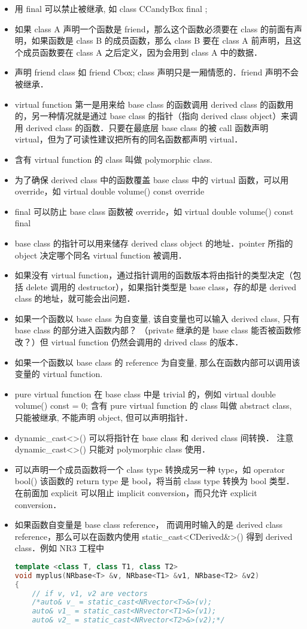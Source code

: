 \begin{itemize}
\item 用 final 可以禁止被继承, 如 class CCandyBox final {};
\item 如果 class A 声明一个函数是 friend，那么这个函数必须要在 class 的前面有声明，如果函数是 class B 的成员函数，那么 class B 要在 class A 前声明，且这个成员函数要在 class A 之后定义，因为会用到 class A 中的数据．
\item 声明 friend class 如 friend Cbox; class 声明只是一厢情愿的．friend 声明不会被继承．
\item virtual function 第一是用来给 base class 的函数调用 derived class 的函数用的，另一种情况就是通过 base class 的指针（指向 derived class object）来调用 derived class 的函数．只要在最底层 base class 的被 call 函数声明 virtual，但为了可读性建议把所有的同名函数都声明 virtual．
\item 含有 virtual function 的 class 叫做 polymorphic class.
\item 为了确保 derived class 中的函数覆盖 base class 中的 virtual 函数，可以用 override，如 virtual double volume() const override
\item final 可以防止 base class 函数被 override，如 virtual double volume() const final
\item base class 的指针可以用来储存 derived class object 的地址．pointer 所指的 object 决定哪个同名 virtual function 被调用．
\item 如果没有 virtual function，通过指针调用的函数版本将由指针的类型决定（包括 delete 调用的 destructor），如果指针类型是 base class，存的却是 derived class 的地址，就可能会出问题．
\item 如果一个函数以 base class 为自变量, 该自变量也可以输入 derived class, 只有 base class 的部分进入函数内部？ （private 继承的是 base class 能否被函数修改？）但 virtual function 仍然会调用的 drived class 的版本．
\item 如果一个函数以 base class 的 reference 为自变量, 那么在函数内部可以调用该变量的 virtual function.
\item pure virtual function 在 base class 中是 trivial 的，例如 virtual double volume() const = 0; 含有 pure virtual function 的 class 叫做 abstract class, 只能被继承, 不能声明 object, 但可以声明指针．
\item dynamic_cast<>() 可以将指针在 base class 和 derived class 间转换． 注意 dynamic_cast<>() 只能对 polymorphic class 使用．
\item 可以声明一个成员函数将一个 class type 转换成另一种 type，如 operator bool() {} 该函数的 return type 是 bool，将当前 class type 转换为 bool 类型．在前面加 explicit 可以阻止 implicit conversion，而只允许 explicit conversion．
\item 如果函数自变量是 base class reference， 而调用时输入的是 derived class reference，那么可以在函数内使用 static_cast<CDerived&>() 得到 derived class．例如 NR3 工程中
\begin{lstlisting}[language=cpp]
template <class T, class T1, class T2>
void myplus(NRbase<T> &v, NRbase<T1> &v1, NRbase<T2> &v2)
{
	// if v, v1, v2 are vectors
	/*auto& v_ = static_cast<NRvector<T>&>(v);
	auto& v1_ = static_cast<NRvector<T1>&>(v1);
	auto& v2_ = static_cast<NRvector<T2>&>(v2);*/


\end{lstlisting}
\end{itemize}
